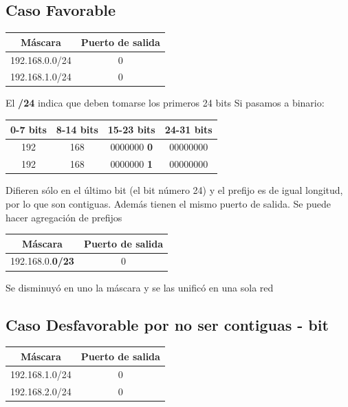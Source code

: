 \documentclass[titlepage,a4paper]{article}
\begin{document}
\subsection{Caso Favorable}

\begin{center}
    \begin{tabular}{c|c}
        Máscara & Puerto de salida \\
        \hline
        \hline
         192.168.0.0/24 &  0\\
         \hline
         192.168.1.0/24 &  0
    \end{tabular}
\end{center}

El \textbf{/24} indica que deben tomarse los primeros 24 bits
Si pasamos a binario:

\begin{center}
    \begin{tabular}{c|c|c|c}
        0-7 bits & 8-14 bits & 15-23 bits & 24-31 bits \\
        \hline
        \hline
        192 & 168 & 0000000 \textbf{0} & 00000000 \\
        \hline
        192 & 168 & 0000000 \textbf{1} & 00000000 \\
    \end{tabular}
\end{center}

Difieren sólo en el último bit (el bit número 24) y el prefijo es de igual longitud, por lo que son contiguas. Además tienen el mismo puerto de salida. Se puede hacer agregación de prefijos

\begin{center}
    \begin{tabular}{c|c}
        Máscara & Puerto de salida \\
        \hline
        \hline
         192.168.0.\textbf{0/23} &  0\\
    \end{tabular}
\end{center}

Se disminuyó en uno la máscara y se las unificó en una sola red

\subsection{Caso Desfavorable por no ser contiguas - bit}

\begin{center}
    \begin{tabular}{c|c}
        Máscara & Puerto de salida \\
        \hline
        \hline
         192.168.1.0/24 &  0\\
         \hline
         192.168.2.0/24 &  0
    \end{tabular}
\end{center}
\end{document}
